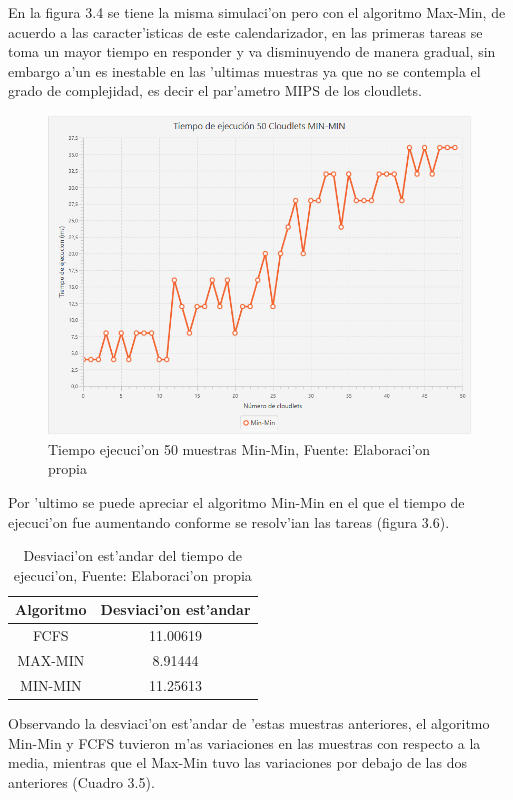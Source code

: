  En la figura 3.4 se tiene la misma simulaci'on pero con el algoritmo Max-Min, de acuerdo a las caracter'isticas de este calendarizador, en las primeras tareas se toma un mayor tiempo en responder y va disminuyendo de manera gradual, sin embargo a'un es inestable en las 'ultimas muestras ya que no se contempla el grado de complejidad, es decir el par'ametro MIPS de los cloudlets.

\begin{figure}[H] 
	\caption{Tiempo ejecuci'on 50 muestras Min-Min, Fuente: Elaboraci'on propia}
	\centering
	\includegraphics[scale=0.5]{media/min-min}
\end{figure}


Por 'ultimo se puede apreciar el algoritmo Min-Min en el que el tiempo de ejecuci'on fue aumentando conforme se resolv'ian las tareas (figura 3.6).

\begin{table}[!hbt]
	\centering
	\caption{Desviaci'on est'andar del tiempo de ejecuci'on, Fuente: Elaboraci'on propia}
	\label{my-label}
	\begin{tabular}{@{}cc@{}}
		\toprule
		{\bf Algoritmo} & \multicolumn{1}{l}{{\bf Desviaci'on est'andar}} \\ \midrule
		FCFS & 11.00619 \\
		MAX-MIN & 8.91444 \\
		MIN-MIN & 11.25613 \\ \bottomrule
	\end{tabular}
\end{table}

Observando la desviaci'on est'andar de 'estas muestras anteriores, el algoritmo Min-Min y FCFS tuvieron m'as variaciones en las muestras con respecto a la media, mientras que el Max-Min tuvo las variaciones por debajo de las dos anteriores (Cuadro 3.5).